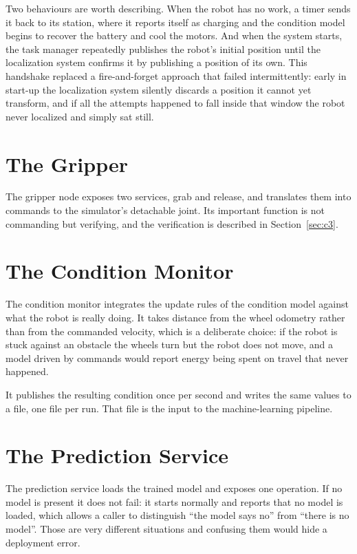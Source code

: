 \documentclass[12pt,a4paper]{report}
\begin{document}
Two behaviours are worth describing. When the robot has no work, a timer sends it back to its
station, where it reports itself as charging and the condition model begins to recover the battery
and cool the motors. And when the system starts, the task manager repeatedly publishes the robot's
initial position until the localization system confirms it by publishing a position of its own.
This handshake replaced a fire-and-forget approach that failed intermittently: early in start-up the
localization system silently discards a position it cannot yet transform, and if all the attempts
happened to fall inside that window the robot never localized and simply sat still.

\section{The Gripper}
The gripper node exposes two services, grab and release, and translates them into commands to the
simulator's detachable joint. Its important function is not commanding but verifying, and the
verification is described in Section~\ref{sec:c3}.

\section{The Condition Monitor}
The condition monitor integrates the update rules of the condition model against what the robot is
really doing. It takes distance from the wheel odometry rather than from the commanded velocity,
which is a deliberate choice: if the robot is stuck against an obstacle the wheels turn but the
robot does not move, and a model driven by commands would report energy being spent on travel that
never happened.

It publishes the resulting condition once per second and writes the same values to a file, one file
per run. That file is the input to the machine-learning pipeline.

\section{The Prediction Service}
The prediction service loads the trained model and exposes one operation. If no model is present it
does not fail: it starts normally and reports that no model is loaded, which allows a caller to
distinguish ``the model says no'' from ``there is no model''. Those are very different situations
and confusing them would hide a deployment error.
\end{document}
